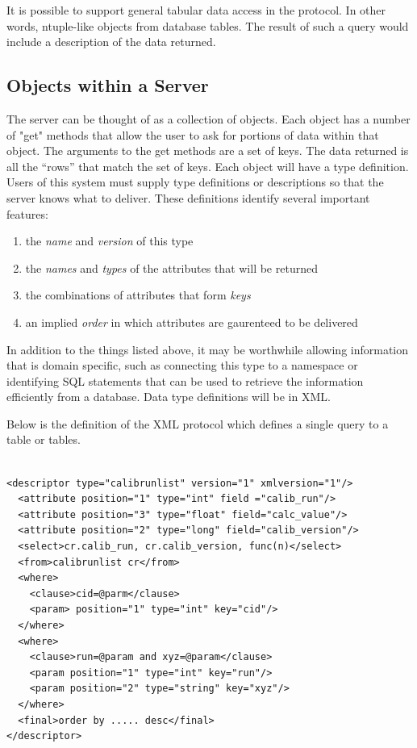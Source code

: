 It is possible to support general tabular data access in the
protocol. In other words, ntuple-like objects from database
tables. The result of such a query would include a description of the
data returned.

\subsection{Objects within a Server}

The server can be thought of as a collection of objects.  Each object has
a number of "get" methods that allow the user to ask for portions of data
within that object.  The arguments to the get methods are a set of keys.
The data returned is all the ``rows'' that match the set of keys.
Each object will have a type definition.  Users of this system must
supply type definitions or descriptions so that the server knows what
to deliver.  These definitions identify several important features:

\begin{enumerate}
\item the \emph{name} and \emph{version} of this type
\item the \emph{names} and \emph{types} of the attributes that will be
returned
\item the combinations of attributes that form \emph{keys}
\item an implied \emph{order} in which attributes are gaurenteed
to be delivered
\end{enumerate}

In addition to the things listed above, it may be worthwhile allowing
information that is domain specific, such as connecting this type
to a namespace or identifying SQL statements that can be used to
retrieve the information efficiently from a database.  Data type 
definitions will be in XML.

Below is the definition of the XML protocol which defines a single query
to a table or tables. 

\begin{verbatim}

<descriptor type="calibrunlist" version="1" xmlversion="1"/>
  <attribute position="1" type="int" field ="calib_run"/>
  <attribute position="3" type="float" field="calc_value"/>
  <attribute position="2" type="long" field="calib_version"/>
  <select>cr.calib_run, cr.calib_version, func(n)</select>
  <from>calibrunlist cr</from>
  <where>
    <clause>cid=@parm</clause>
    <param> position="1" type="int" key="cid"/>
  </where>
  <where>
    <clause>run=@param and xyz=@param</clause>
    <param position="1" type="int" key="run"/>
    <param position="2" type="string" key="xyz"/>
  </where>
  <final>order by ..... desc</final>
</descriptor>

\end{verbatim}

